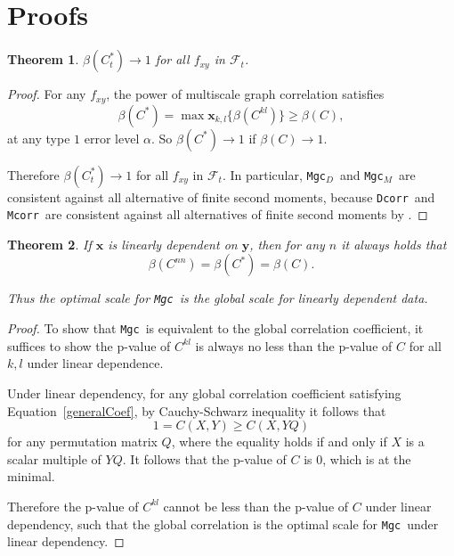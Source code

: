 \documentclass[11pt]{article}
\providecommand{\sct}[1]{{\sc \texttt{#1}}}
\providecommand{\mb}[1]{\boldsymbol{#1}}
\providecommand{\mc}[1]{\mathcal{#1}}
\newcommand{\G}{C}
\newcommand{\Mgc}{\sct{Mgc}}
\newcommand{\Mgcd}{\sct{Mgc$_D$}}
\newcommand{\Mgcm}{\sct{Mgc$_M$}}
\newcommand{\Dcorr}{\sct{Dcorr}}
\newcommand{\Mcorr}{\sct{Mcorr}}
\newcommand{\mbx}{\ensuremath{\mb{x}}}
\newtheorem{appThm}{Theorem}
\begin{document}
\section{Proofs}
\label{appen:proofs}
\begin{appThm}
$\beta(\G_t^*) \rightarrow 1$ for all $f_{xy}$ in $\mc{F}_t$.
\end{appThm}
\begin{proof}
For any $f_{xy}$, the power of multiscale graph correlation satisfies
\begin{equation}
\beta(\G^{*})=\max\mbx_{k,l}\{\beta(\G^{kl})\} \geq \beta(\G),
\end{equation}
at any type $1$ error level $\alpha$. So $\beta(\G^{*}) \rightarrow 1$ if $\beta(\G) \rightarrow 1$.

Therefore $\beta(\G_t^*) \rightarrow 1$ for all $f_{xy}$ in $\mc{F}_t$. In particular, \Mgcd~and \Mgcm~are consistent against all alternative of finite second moments, because \Dcorr~and \Mcorr~are consistent against all alternatives of finite second moments by \cite{SzekelyRizzoBakirov2007, SzekelyRizzo2013a}.
\end{proof}

\begin{appThm}
\label{at:linear}
If $\mb{x}$ is linearly dependent on $\mb{y}$, then for any $n$ it always holds that
\begin{equation}
\beta(\G^{nn}) = \beta(\G^{*}) = \beta(\G).
\end{equation}

Thus the optimal scale for \Mgc~is the global scale for linearly dependent data.
\end{appThm}

\begin{proof}
To show that \Mgc~is equivalent to the global correlation coefficient, it suffices to show the p-value of $\G^{kl}$ is always no less than the p-value of $\G$ for all $k,l$ under linear dependence.

Under linear dependency, for any global correlation coefficient satisfying Equation~\ref{generalCoef}, by Cauchy-Schwarz inequality it follows that
\begin{equation}
1=\G(X, Y) \geq \G(X, YQ)
\end{equation}
for any permutation matrix $Q$, where the equality holds if and only if $X$ is a scalar multiple of $YQ$. It follows that the p-value of $\G$ is $0$, which is at the minimal.

Therefore the p-value of $\G^{kl}$ cannot be less than the p-value of $\G$ under linear dependency, such that the global correlation is the optimal scale for \Mgc~under linear dependency.
\end{proof}
\end{document}
